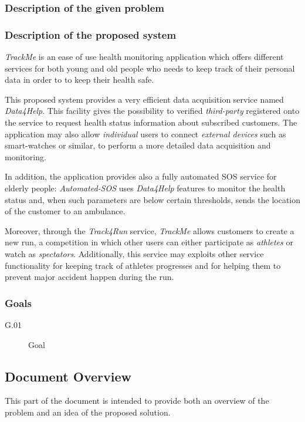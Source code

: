 \documentclass[a4paper]{article}
\begin{document}
        \subsubsection{Description of the given problem}
        
        \subsubsection{Description of the proposed system}
        \textit{TrackMe} is an ease of use health monitoring application which offers different services for both young and old people who needs to keep track of their personal data in order to to keep their health safe.
        
        This proposed system provides a very efficient data acquisition service named \textit{Data4Help}. This facility gives the possibility to verified \textit{third-party} registered onto the service to request health status information about subscribed customers. The application may also allow \textit{individual} users to connect \textit{external devices} such as smart-watches or similar, to perform a more detailed data acquisition and monitoring.
        
        In addition, the application provides also a fully automated SOS service for elderly people: \textit{Automated-SOS} uses \textit{Data4Help} features to monitor the health status and, when such parameters are below certain thresholds, sends the location of the customer to an ambulance.
    
        Moreover, through the \textit{Track4Run} service, \textit{TrackMe} allows customers to create a new run, a competition in which other users can either participate as \textit{athletes} or watch as \textit{spectators}. Additionally, this service may exploits other service functionality for keeping track of athletes progresses and for helping them to prevent major accident happen during the run. 
        \subsubsection{Goals}
        
        \begin{description}
            \item[G.01] Goal
        \end{description}
    
    \subsection{Document Overview}
        This part of the document is intended to provide both an overview of the problem and an idea of the proposed solution.
        
\end{document}

